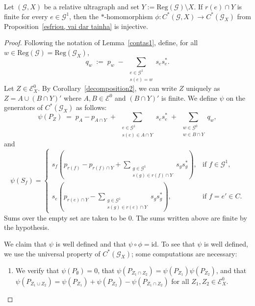 \documentclass[10pt,a4paper]{amsart}
\begin{document}
\begin{proposition}\label{isomorphismrelative}
Let $(\mathcal{G},X)$ be a relative ultragraph and set
$Y:=\mathrm{Reg}(\mathcal{G})\setminus X$. If $r(e)\cap Y$ is finite for every
$e\in\mathcal{G}^1$, then the $*$-homomorphism
$\phi: C^*(\mathcal{G},X)\to C^*(\mathcal{G}_X)$ from
Proposition~\ref{esfriou, vai dar tainha} is injective.
\end{proposition}

\begin{proof}
Following the notation of Lemma~\ref{contas1}, define, for all
$w \in \mathrm{Reg}(\mathcal{G})=\mathrm{Reg}(\mathcal{G}_X)$,
\[
q_w \;:=\; p_w \;-\; \sum_{\substack{e \in \mathcal{G}^1 \\ s(e)=w}} s_e s_e^* .
\]
Let $Z \in \mathcal{E}_X^0$. By Corollary~\ref{decomposition2}, we can write $Z$ uniquely as
$Z = A \cup (B \cap Y)'$ where $A,B \in \mathcal{E}^0$ and $(B \cap Y)'$ is finite. We define $\psi$
on the generators of $C^*(\mathcal{G}_X)$ as follows:
\[
\psi(P_Z)
\;=\;
p_A - p_{A \cap Y}
\;+\;
\sum_{\substack{e \in \mathcal{G}^1 \\ s(e) \in A \cap Y}} s_e s_e^*
\;+\;
\sum_{\substack{w \in \mathcal{G}^0 \\ w \in B \cap Y}} q_w,
\]
and
\[
\psi(S_f)
=
\begin{cases}
\displaystyle
s_f \!\left(
p_{r(f)}
-
p_{r(f)\cap Y}
+
\sum_{\substack{g \in \mathcal{G}^1 \\ s(g) \in r(f)\cap Y}}
s_g s_g^*
\right),
& \text{if } f \in \mathcal{G}^1, \\[10pt]
\displaystyle
s_e \!\left(
p_{r(e)\cap Y}
-
\sum_{\substack{g \in \mathcal{G}^1 \\ s(g) \in r(e)\cap Y}}
s_g s_g^*
\right),
& \text{if } f=e' \in C.
\end{cases}
\]
Sums over the empty set are taken to be $0$. The sums written above are finite by the hypothesis.

We claim that $\psi$ is well defined and that $\psi \circ \phi = \mathrm{id}$. To see that $\psi$ is
well defined, we use the universal property of $C^*(\mathcal{G}_X)$; some computations are necessary:

\begin{enumerate}
\item We verify that $\psi(P_\emptyset)=0$, that
$\psi(P_{Z_1 \cap Z_2}) = \psi(P_{Z_1}) \psi(P_{Z_2})$, and that
$\psi(P_{Z_1\cup Z_2})= \psi(P_{Z_1})+\psi(P_{Z_2})-\psi(P_{Z_1\cap Z_2})$ for all
$Z_1, Z_2 \in \mathcal{E}_X^0$.


\end{enumerate}
\end{proof}
\end{document}
